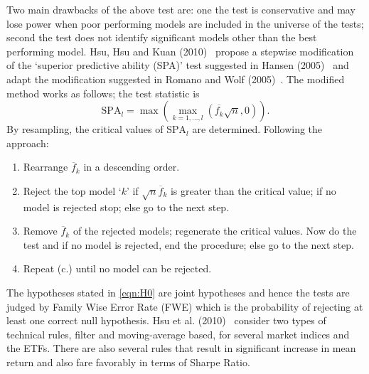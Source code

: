Two main drawbacks of the above test are: one the test is conservative and may lose power when poor performing models are included in the universe of the tests; second the test does not identify significant models other than the best performing model. Hsu, Hsu and Kuan (2010)~\cite{hsukuan2010} propose a stepwise modification of the `superior predictive ability (SPA)' test suggested in Hansen (2005)~\cite{hansen2005} and adapt the modification suggested in Romano and Wolf (2005)~\cite{romano2005}. The modified method works as follows; the test statistic is
	\begin{equation} \label{eqn:SPA}
	\text{SPA}_l = \max\left(\max_{k=1,\ldots,l} ( \overline{f_k} \sqrt{n}, 0 ) \right).
	\end{equation}
By resampling, the critical values of $\text{SPA}_l$ are determined. Following the approach:


\begin{enumerate}[(a.)]
\item Rearrange $\overline{f}_k$ in a descending order.
\item Reject the top model `$k$' if $\sqrt{n}\overline{f}_k$ is greater than the critical value; if no model is rejected stop; else go to the next step.
\item Remove $\overline{f}_k$ of the rejected models; regenerate the critical values. Now do the test and if no model is rejected, end the procedure; else go to the next step.
\item Repeat (c.) until no model can be rejected.
\end{enumerate}


The hypotheses stated in \eqref{eqn:H0} are joint hypotheses and hence the tests are judged by Family Wise Error Rate (FWE) which is the probability of rejecting at least one correct null hypothesis. Hsu et al. (2010)~\cite{hsukuan2010} consider two types of technical rules, filter and moving-average based, for several market indices and the ETFs. There are also several rules that result in significant increase in mean return and also fare favorably in terms of Sharpe Ratio.


